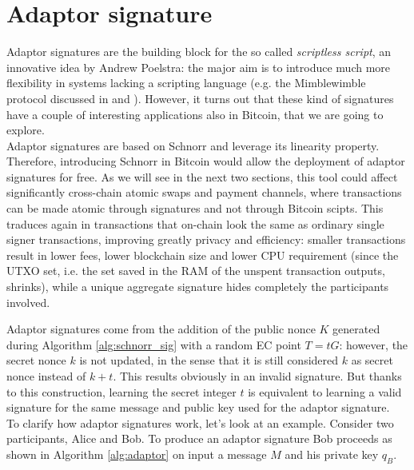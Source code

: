 \bigskip

\bigskip

\section{Adaptor signature}
\label{adaptor}
Adaptor signatures are the building block for the so called \textit{scriptless script}, an innovative idea by Andrew Poelstra: the major aim is to introduce much more flexibility in systems lacking a scripting language (e.g. the Mimblewimble protocol discussed in \cite{MW1} and \cite{MW2}). However, it turns out that these kind of signatures have a couple of interesting applications also in Bitcoin, that we are going to explore.
\\
Adaptor signatures are based on Schnorr and leverage its linearity property. Therefore, introducing Schnorr in Bitcoin would allow the deployment of adaptor signatures for free. As we will see in the next two sections, this tool could affect significantly cross-chain atomic swaps and payment channels, where transactions can be made atomic through signatures and not through Bitcoin scipts. This traduces again in transactions that on-chain look the same as ordinary single signer transactions, improving greatly privacy and efficiency: smaller transactions result in lower fees, lower blockchain size and lower CPU requirement (since the UTXO set, i.e. the set saved in the RAM of the unspent transaction outputs, shrinks), while a unique aggregate signature hides completely the participants involved.

\bigskip
\noindent
Adaptor signatures come from the addition of the public nonce $K$ generated during Algorithm \ref{alg:schnorr_sig} with a random EC point $T = tG$: however, the secret nonce $k$ is not updated, in the sense that it is still considered $k$ as secret nonce instead of $k + t$. This results obviously in an invalid signature. But thanks to this construction, learning the secret integer $t$ is equivalent to learning a valid signature for the same message and public key used for the adaptor signature.
\\
To clarify how adaptor signatures work, let's look at an example. Consider two participants, Alice and Bob. To produce an adaptor signature Bob proceeds as shown in Algorithm \ref{alg:adaptor} on input a message $M$ and his private key $q_B$.

